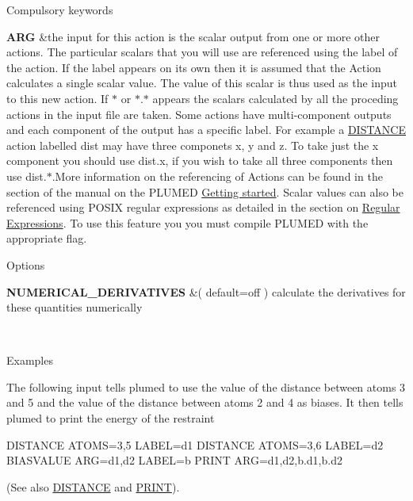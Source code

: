 \begin{DoxyParagraph}{Compulsory keywords}

\end{DoxyParagraph}
\begin{TabularC}{2}
\hline
{\bfseries  A\+R\+G } &the input for this action is the scalar output from one or more other actions. The particular scalars that you will use are referenced using the label of the action. If the label appears on its own then it is assumed that the Action calculates a single scalar value. The value of this scalar is thus used as the input to this new action. If $\ast$ or $\ast$.$\ast$ appears the scalars calculated by all the proceding actions in the input file are taken. Some actions have multi-\/component outputs and each component of the output has a specific label. For example a \hyperlink{DISTANCE}{D\+I\+S\+T\+A\+N\+C\+E} action labelled dist may have three componets x, y and z. To take just the x component you should use dist.\+x, if you wish to take all three components then use dist.$\ast$.More information on the referencing of Actions can be found in the section of the manual on the P\+L\+U\+M\+E\+D \hyperlink{_syntax}{Getting started}. Scalar values can also be referenced using P\+O\+S\+I\+X regular expressions as detailed in the section on \hyperlink{Regex}{Regular Expressions}. To use this feature you you must compile P\+L\+U\+M\+E\+D with the appropriate flag.   \\
\end{TabularC}


\begin{DoxyParagraph}{Options}

\end{DoxyParagraph}
\begin{TabularC}{2}
\hline
{\bfseries  N\+U\+M\+E\+R\+I\+C\+A\+L\+\_\+\+D\+E\+R\+I\+V\+A\+T\+I\+V\+E\+S } &( default=off ) calculate the derivatives for these quantities numerically  

\\
\end{TabularC}


\begin{DoxyParagraph}{Examples}

\end{DoxyParagraph}
The following input tells plumed to use the value of the distance between atoms 3 and 5 and the value of the distance between atoms 2 and 4 as biases. It then tells plumed to print the energy of the restraint \begin{DoxyVerb}DISTANCE ATOMS=3,5 LABEL=d1
DISTANCE ATOMS=3,6 LABEL=d2
BIASVALUE ARG=d1,d2 LABEL=b
PRINT ARG=d1,d2,b.d1,b.d2
\end{DoxyVerb}
 (See also \hyperlink{DISTANCE}{D\+I\+S\+T\+A\+N\+C\+E} and \hyperlink{PRINT}{P\+R\+I\+N\+T}).

